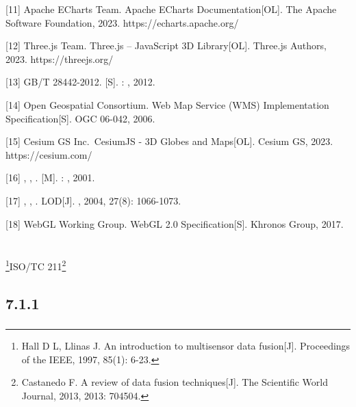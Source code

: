 {[}11{]} Apache ECharts Team. Apache ECharts Documentation{[}OL{]}. The
Apache Software Foundation, 2023. https://echarts.apache.org/

{[}12{]} Three.js Team. Three.js -- JavaScript 3D Library{[}OL{]}.
Three.js Authors, 2023. https://threejs.org/

{[}13{]} GB/T 28442-2012. {[}S{]}. : , 2012.

{[}14{]} Open Geospatial Consortium. Web Map Service (WMS)
Implementation Specification{[}S{]}. OGC 06-042, 2006.

{[}15{]} Cesium GS Inc.~CesiumJS - 3D Globes and Maps{[}OL{]}. Cesium
GS, 2023. https://cesium.com/

{[}16{]} , , . {[}M{]}. : , 2001.

{[}17{]} , , . LOD{[}J{]}. , 2004, 27(8): 1066-1073.

{[}18{]} WebGL Working Group. WebGL 2.0 Specification{[}S{]}. Khronos
Group, 2017.

\hypertarget{section-22}{%
\subsection{}\label{section-22}}

\hypertarget{section-23}{%
\section{}\label{section-23}}

\hypertarget{section-24}{%
\subsection{}\label{section-24}}

\footnote{Hall D L, Llinas J. An introduction to multisensor data
  fusion{[}J{]}. Proceedings of the IEEE, 1997, 85(1): 6-23.}ISO/TC
211\footnote{Castanedo F. A review of data fusion techniques{[}J{]}. The
  Scientific World Journal, 2013, 2013: 704504.}

\hypertarget{section-25}{%
\subsection{7.1.1}\label{section-25}}

\hypertarget{section-26}{%
\subsubsection{}\label{section-26}}

